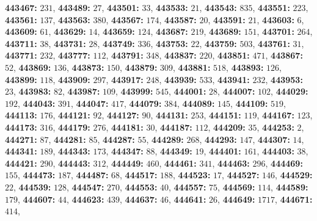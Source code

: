 \textsf{\bfseries 443467:} $231$, \textsf{\bfseries 443489:} $27$, \textsf{\bfseries 443501:} $33$, \textsf{\bfseries 443533:} $21$, \textsf{\bfseries 443543:} $835$, \textsf{\bfseries 443551:} $223$, \textsf{\bfseries 443561:} $137$, \textsf{\bfseries 443563:} $380$, \textsf{\bfseries 443567:} $174$, \textsf{\bfseries 443587:} $20$, \textsf{\bfseries 443591:} $21$, \textsf{\bfseries 443603:} $6$, \textsf{\bfseries 443609:} $61$, \textsf{\bfseries 443629:} $14$, \textsf{\bfseries 443659:} $124$, \textsf{\bfseries 443687:} $219$, \textsf{\bfseries 443689:} $151$, \textsf{\bfseries 443701:} $264$, \textsf{\bfseries 443711:} $38$, \textsf{\bfseries 443731:} $28$, \textsf{\bfseries 443749:} $336$, \textsf{\bfseries 443753:} $22$, \textsf{\bfseries 443759:} $503$, \textsf{\bfseries 443761:} $31$, \textsf{\bfseries 443771:} $232$, \textsf{\bfseries 443777:} $112$, \textsf{\bfseries 443791:} $348$, \textsf{\bfseries 443837:} $220$, \textsf{\bfseries 443851:} $471$, \textsf{\bfseries 443867:} $52$, \textsf{\bfseries 443869:} $136$, \textsf{\bfseries 443873:} $150$, \textsf{\bfseries 443879:} $309$, \textsf{\bfseries 443881:} $518$, \textsf{\bfseries 443893:} $126$, \textsf{\bfseries 443899:} $118$, \textsf{\bfseries 443909:} $297$, \textsf{\bfseries 443917:} $248$, \textsf{\bfseries 443939:} $533$, \textsf{\bfseries 443941:} $232$, \textsf{\bfseries 443953:} $23$, \textsf{\bfseries 443983:} $82$, \textsf{\bfseries 443987:} $109$, \textsf{\bfseries 443999:} $545$, \textsf{\bfseries 444001:} $28$, \textsf{\bfseries 444007:} $102$, \textsf{\bfseries 444029:} $192$, \textsf{\bfseries 444043:} $391$, \textsf{\bfseries 444047:} $417$, \textsf{\bfseries 444079:} $384$, \textsf{\bfseries 444089:} $145$, \textsf{\bfseries 444109:} $519$, \textsf{\bfseries 444113:} $176$, \textsf{\bfseries 444121:} $92$, \textsf{\bfseries 444127:} $90$, \textsf{\bfseries 444131:} $253$, \textsf{\bfseries 444151:} $119$, \textsf{\bfseries 444167:} $123$, \textsf{\bfseries 444173:} $316$, \textsf{\bfseries 444179:} $276$, \textsf{\bfseries 444181:} $30$, \textsf{\bfseries 444187:} $112$, \textsf{\bfseries 444209:} $35$, \textsf{\bfseries 444253:} $2$, \textsf{\bfseries 444271:} $87$, \textsf{\bfseries 444281:} $85$, \textsf{\bfseries 444287:} $55$, \textsf{\bfseries 444289:} $268$, \textsf{\bfseries 444293:} $147$, \textsf{\bfseries 444307:} $14$, \textsf{\bfseries 444341:} $189$, \textsf{\bfseries 444343:} $173$, \textsf{\bfseries 444347:} $88$, \textsf{\bfseries 444349:} $19$, \textsf{\bfseries 444401:} $161$, \textsf{\bfseries 444403:} $38$, \textsf{\bfseries 444421:} $290$, \textsf{\bfseries 444443:} $312$, \textsf{\bfseries 444449:} $460$, \textsf{\bfseries 444461:} $341$, \textsf{\bfseries 444463:} $296$, \textsf{\bfseries 444469:} $155$, \textsf{\bfseries 444473:} $187$, \textsf{\bfseries 444487:} $68$, \textsf{\bfseries 444517:} $188$, \textsf{\bfseries 444523:} $17$, \textsf{\bfseries 444527:} $146$, \textsf{\bfseries 444529:} $22$, \textsf{\bfseries 444539:} $128$, \textsf{\bfseries 444547:} $270$, \textsf{\bfseries 444553:} $40$, \textsf{\bfseries 444557:} $75$, \textsf{\bfseries 444569:} $114$, \textsf{\bfseries 444589:} $179$, \textsf{\bfseries 444607:} $44$, \textsf{\bfseries 444623:} $439$, \textsf{\bfseries 444637:} $46$, \textsf{\bfseries 444641:} $26$, \textsf{\bfseries 444649:} $1717$, \textsf{\bfseries 444671:} $414$, 
